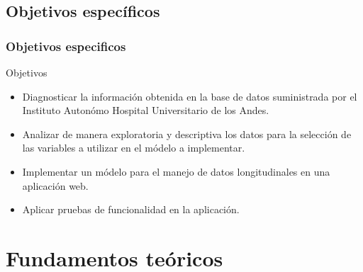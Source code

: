 \documentclass{beamer}%
\begin{document}
\subsection{Objetivos espec\'ificos}
\begin{frame}[fragile]
\frametitle{\textbf{Objetivos especificos}}
\begin{block}{Objetivos}
\end{block}
\begin{itemize}
\item Diagnosticar la informaci\'on obtenida en la base de datos suministrada por el Instituto Auton\'omo Hospital Universitario de los Andes.
\item Analizar de manera exploratoria y descriptiva los datos para la selecci\'on de las variables a utilizar en el m\'odelo a implementar.
\item Implementar un m\'odelo para el manejo de datos longitudinales en una aplicaci\'on web.
\item Aplicar pruebas de funcionalidad en la aplicaci\'on.
\end{itemize}
\end{frame}

\section{Fundamentos te\'oricos}
\end{document}
